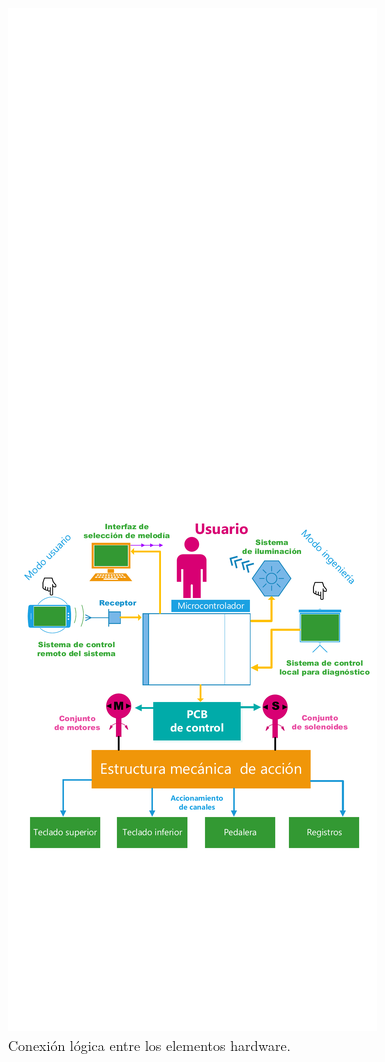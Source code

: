 \begin{figure}[H]
\begin{centering}
		\includegraphics[width=\linewidth*3/4]{capitulo3/general}
		\par\end{centering}
	\smallskip
	\caption{\label{fig:general} Conexión lógica entre los elementos hardware.}
\end{figure} 

